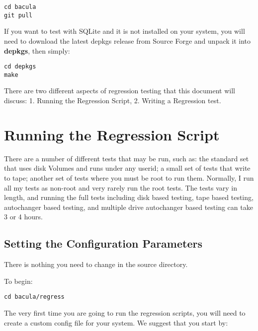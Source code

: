 \footnotesize
\begin{verbatim}
cd bacula
git pull
\end{verbatim}
\normalsize

If you want to test with SQLite and it is not installed on your system,
you will need to download the latest depkgs release from Source Forge and       
unpack it into {\bf depkgs}, then simply: 

\footnotesize
\begin{verbatim}
cd depkgs
make
\end{verbatim}
\normalsize


There are two different aspects of regression testing that this document will
discuss: 1. Running the Regression Script, 2. Writing a Regression test. 

\section{Running the Regression Script}

There are a number of different tests that may be run, such as: the standard
set that uses disk Volumes and runs under any userid; a small set of tests
that write to tape; another set of tests where you must be root to run them.
Normally, I run all my tests as non-root and very rarely run the root
tests.  The tests vary in length, and running the full tests including disk
based testing, tape based testing, autochanger based testing, and multiple
drive autochanger based testing can take 3 or 4 hours.

\subsection{Setting the Configuration Parameters}

There is nothing you need to change in the source directory.  
 
To begin:

\footnotesize
\begin{verbatim}
cd bacula/regress
\end{verbatim}
\normalsize


The        
very first time you are going to run the regression scripts, you will
need to create a custom config file for your system. 
We suggest that you start by:

